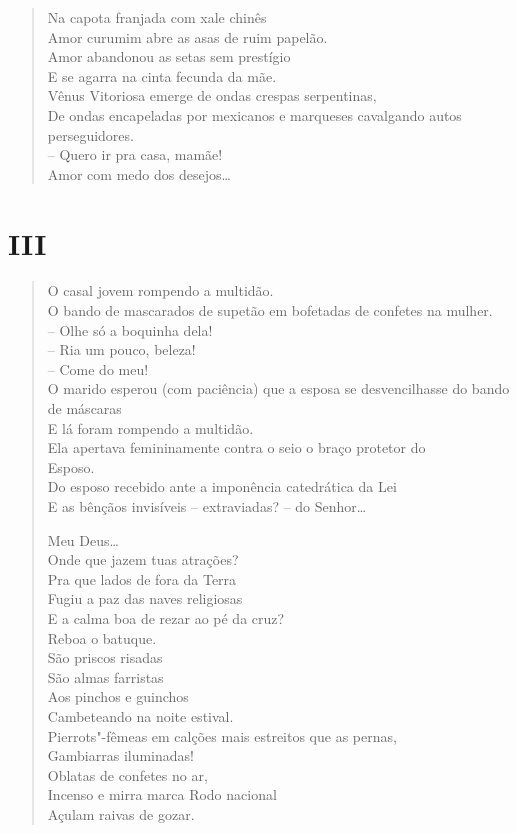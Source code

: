 {\begin{verse}
Na capota franjada com xale chinês\\
Amor curumim abre as asas de ruim papelão.\\
Amor abandonou as setas sem prestígio\\
E se agarra na cinta fecunda da mãe.\\
Vênus Vitoriosa emerge de ondas crespas serpentinas,\\
De ondas encapeladas por mexicanos e marqueses cavalgando autos perseguidores.\\
-- Quero ir pra casa, mamãe!\\

Amor com medo dos desejos\ldots{}
\end{verse}

\medskip
\section*{III}

\begin{verse}
O casal jovem rompendo a multidão.\\
O bando de mascarados de supetão em bofetadas de confetes na mulher.\\
-- Olhe só a boquinha dela!\\
-- Ria um pouco, beleza!\\
-- Come do meu!\\
O marido esperou (com paciência) que a esposa se desvencilhasse do bando de máscaras\\
E lá foram rompendo a multidão.\\
Ela apertava femininamente contra o seio o braço protetor do\\
Esposo.\\
Do esposo recebido ante a imponência catedrática da Lei\\
E as bênçãos invisíveis -- extraviadas? -- do Senhor\ldots{}

Meu Deus\ldots{}\\
Onde que jazem tuas atrações?\\
Pra que lados de fora da Terra\\
Fugiu a paz das naves religiosas\\
E a calma boa de rezar ao pé da cruz?\\
Reboa o batuque.\\
São priscos risadas\\
São almas farristas\\
Aos pinchos e guinchos\\
Cambeteando na noite estival.\\
Pierrots"-fêmeas em calções mais estreitos que as pernas,\\
\qquad{}Gambiarras iluminadas!\\
Oblatas de confetes no ar,\\
Incenso e mirra marca Rodo nacional\\
Açulam raivas de gozar.


\end{verse}}
